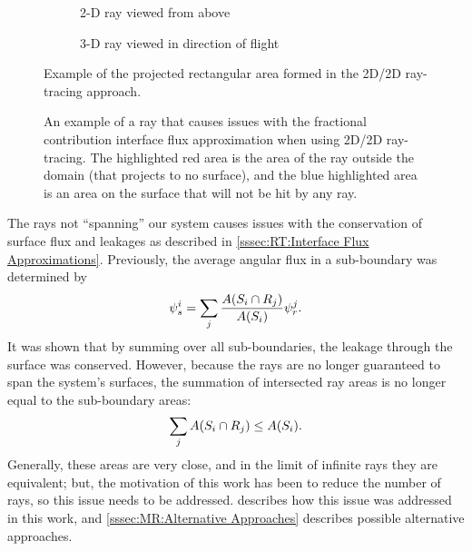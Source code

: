 {{{      \begin{figure}[htbp]
          \centering
          \begin{subfigure}[t]{0.45\textwidth}
              \centering
              \def\svgwidth{0.70\linewidth}
              
              \caption{2-D ray viewed from above\label{fig:MR:MacroRayProjections}}
          \end{subfigure}%
          \begin{subfigure}[t]{0.45\textwidth}
              \centering
              \def\svgwidth{0.70\linewidth}
              
              \caption{3-D ray viewed in direction of flight\label{fig:MR:MacroRayProjectionsDOF}}
          \end{subfigure}
          \caption{Example of the projected rectangular area formed in the 2D/2D ray-tracing approach.}
          \label{figs:MR:MacroRayProjections}
      \end{figure}

      \begin{figure}[htbp]
        \centering
        \def\svgwidth{0.25\linewidth}
        
        \caption{
            An example of a ray that causes issues with the fractional contribution interface flux approximation when using 2D/2D ray-tracing.
            The highlighted red area is the area of the ray outside the domain (that projects to no surface), and the blue highlighted area is an area on the surface that will not be hit by any ray.}
        \label{fig:MR:MacroRayProjectionProblem}
      \end{figure}

      The rays not ``spanning'' our system causes issues with the conservation of surface flux and leakages as described in \cref{sssec:RT:Interface Flux Approximations}.
      Previously, the average angular flux in a sub-boundary was determined by
      \begin{equation}\label{eq:MR:Old SubBoundary Flux}
        \psi_s^i = \suml[j] \frac{A(S_i\cap R_j)}{A(S_i)}\psi_r^j.
      \end{equation}
      It was shown that by summing over all sub-boundaries, the leakage through the surface was conserved.
      However, because the rays are no longer guaranteed to span the system's surfaces, the summation of intersected ray areas is no longer equal to the sub-boundary areas:
      \begin{equation}\label{eq:MR:Area Imbalance}
        \suml[j] A(S_i\cap R_j) \leq A(S_i).
      \end{equation}
      Generally, these areas are very close, and in the limit of infinite rays they are equivalent; but, the motivation of this work has been to reduce the number of rays, so this issue needs to be addressed.
       describes how this issue was addressed in this work, and \cref{sssec:MR:Alternative Approaches} describes possible alternative approaches.

}}}
